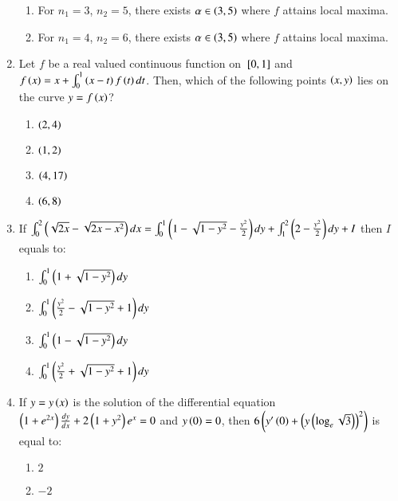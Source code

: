 \documentclass[journal,12pt,onecolumn]{IEEEtran}
\theoremstyle{remark}
\begin{document}
\begin{enumerate}[start=1]
\begin{enumerate}
                        \item For $n_1=3$, $n_2=5$, there exists $\alpha\in\left(3,5\right)$ where $f$ attains local maxima.\\
                        \item For $n_1=4$, $n_2=6$, there exists $\alpha\in\left(3,5\right)$ where $f$ attains local maxima.\\
		\end{enumerate}
	\item Let $f$ be a real valued continuous function on ${}\left[0,1\right]$ and $f\left(x\right)=x+\int_{0}^{1}\left(x-t\right)f\left(t\right)dt$. Then, which of the following points $\left(x,y\right)$ lies on the curve $y=f\left(x\right)$?
		\begin{enumerate}
			\item $\left(2,4\right)$\\
			\item $\left(1,2\right)$\\
			\item $\left(4,17\right)$\\
			\item $\left(6,8\right)$\\
		\end{enumerate}
	\item If $\int_{0}^{2}\left(\sqrt{2x}-\sqrt{2x-x^2}\right)dx=\int_{0}^{1}\left(1-\sqrt{1-y^2}-\frac{y^2}{2}\right)dy+\int_{1}^{2}\left(2-\frac{y^2}{2}\right)dy+I$ then $I$ equals to:
		\begin{enumerate}
			\item $\int_{0}^{1}\left(1+\sqrt{1-y^2}\right)dy$\\
			\item $\int_{0}^{1}\left(\frac{y^2}{2}-\sqrt{1-y^2}+1\right)dy$\\
			\item $\int_{0}^{1}\left(1-\sqrt{1-y^2}\right)dy$\\
			\item $\int_{0}^{1}\left(\frac{y^2}{2}+\sqrt{1-y^2}+1\right)dy$\\
		\end{enumerate}
	\item If $y=y\left(x\right)$ is the solution of the differential equation $\left(1+e^{2x}\right)\frac{dy}{dx}+2\left(1+y^2\right)e^{x}=0$ and $y\left(0\right)=0$, then $6\left(y'\left(0\right)+{\left(y\left(\log_{e}\sqrt{3}\right)\right)}^2\right)$ is equal to:
		\begin{enumerate}
			\item $2$\\
			\item $-2$\\

\end{enumerate}
\end{enumerate}
\end{document}
